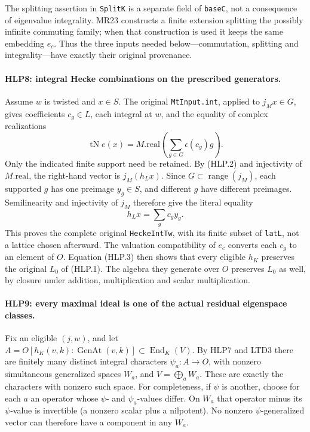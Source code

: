 The splitting assertion in \texttt{Split\allowbreak K} is a separate field of
\texttt{base\allowbreak C}, not a consequence of eigenvalue integrality. MR23
constructs a finite extension splitting the possibly infinite
commuting family; when that construction is used it keeps the same
embedding \(e_c\). Thus the three inputs needed below---commutation,
splitting and integrality---have exactly their original provenance.

\paragraph{HLP8: integral Hecke combinations on the prescribed generators.}
\label{claim:HLP8}
Assume \(w\) is twisted and \(x\in S\). The original
\texttt{Mt\allowbreak Input.int}, applied to \(j_Mx\in G\), gives coefficients
\(c_g\in L\), each integral at \(w\), and the equality of complex
realizations
\[
 \operatorname{tN}e(x)
   =M.\mathrm{real}\!\left(\sum_{g\in G}\epsilon(c_g)g\right).
                                                               \tag{HLP.6}
\]
Only the indicated finite support need be retained. By (HLP.2) and
injectivity of \(M.\mathrm{real}\), the right-hand vector is
\(j_M(h_Lx)\). Since \(G\subset\operatorname{range}(j_M)\), each
supported \(g\) has one preimage \(y_g\in S\), and different \(g\)
have different preimages. Semilinearity and injectivity of \(j_M\)
therefore give the literal equality
\[
                 h_Lx=\sum_g c_g y_g.                \tag{HLP.7}
\]
This proves the complete original \texttt{Hecke\allowbreak Int\allowbreak Tw}, with its
finite subset of \texttt{lat\allowbreak L}, not a lattice chosen afterward.
The valuation compatibility of \(e_c\) converts each \(c_g\) to
an element of \(O\). Equation (HLP.3) then shows that every eligible
\(h_K\) preserves the original \(L_0\) of (HLP.1). The algebra they
generate over \(O\) preserves \(L_0\) as well, by closure under
addition, multiplication and scalar multiplication.

\paragraph{HLP9: every maximal ideal is one of the actual residual eigenspace classes.}
\label{claim:HLP9}
Fix an eligible \((j,w)\), and let
\(A=O[h_K(v,k):\operatorname{GenAt}(v,k)]\subset\operatorname{End}_K(V)\).
By HLP7 and LTD3 there are finitely many distinct integral characters
\(\psi_a:A\to O\), with nonzero simultaneous generalized spaces
\(W_a\), and \(V=\bigoplus_a W_a\). These are exactly the characters
with nonzero such space. For completeness, if \(\psi\) is another,
choose for each \(a\) an operator whose \(\psi\)- and
\(\psi_a\)-values differ. On \(W_a\) that operator minus its
\(\psi\)-value is invertible (a nonzero scalar plus a nilpotent).
No nonzero \(\psi\)-generalized vector can therefore have a
component in any \(W_a\).

